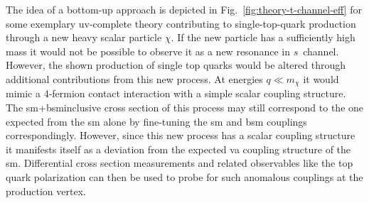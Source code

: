 The idea of a bottom-up approach is depicted in Fig.~\ref{fig:theory-t-channel-eff} for some exemplary \gls{uv}-complete theory contributing to single-top-quark production through a new heavy scalar particle $\chi$. If the new particle has a sufficiently high mass it would not be possible to observe it as a new resonance in $s$~channel. However, the shown production of single top quarks would be altered through additional contributions from this new process. At energies $q\ll m_{\chi}$ it would mimic a 4-fermion contact interaction with a simple scalar coupling structure. The \mbox{\gls{sm}+\gls{bsm}}inclusive cross section of this process may still correspond to the one expected from the \gls{sm} alone by fine-tuning the \gls{sm} and \gls{bsm} couplings correspondingly. However, since this new process has a scalar coupling structure it manifests itself as a deviation from the expected \gls{va} coupling structure of the \gls{sm}. Differential cross section measurements and related observables like the top quark polarization can then be used to probe for such anomalous couplings at the production vertex.


